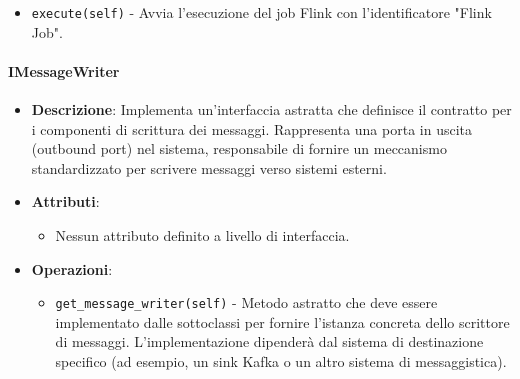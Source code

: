 \documentclass[10pt]{article}
\begin{document}
\begin{itemize}
\begin{itemize}
        \item \texttt{execute(self)} - Avvia l'esecuzione del job Flink con l'identificatore "Flink Job".
    \end{itemize}
    \end{itemize}

    \paragraph{IMessageWriter}
    \begin{itemize} 
    \item \textbf{Descrizione}: Implementa un'interfaccia astratta che definisce il contratto per i componenti di scrittura dei messaggi. Rappresenta una porta in uscita (outbound port) nel sistema, responsabile di fornire un meccanismo standardizzato per scrivere messaggi verso sistemi esterni.
    \item \textbf{Attributi}:
    \begin{itemize}
        \item Nessun attributo definito a livello di interfaccia.
    \end{itemize}
    
    \item \textbf{Operazioni}:
    \begin{itemize}
        \item \texttt{get\_message\_writer(self)} - Metodo astratto che deve essere implementato dalle sottoclassi per fornire l'istanza concreta dello scrittore di messaggi. L'implementazione dipenderà dal sistema di destinazione specifico (ad esempio, un sink Kafka o un altro sistema di messaggistica).
    \end{itemize}
    \end{itemize}
\end{document}

